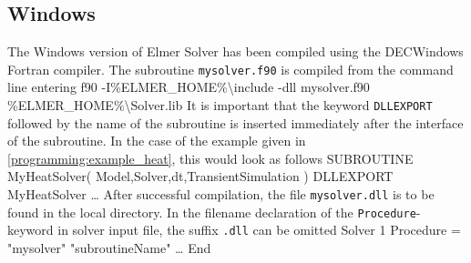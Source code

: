 \subsection{Windows\label{programming:compile_Win}}
The Windows version of Elmer Solver has been compiled using the DECWindows Fortran compiler. The subroutine \texttt{mysolver.f90} is compiled from the command line entering 
\ttbegin
f90 -I\%ELMER_HOME\%\textbackslash{include} -dll mysolver.f90 \%ELMER_HOME\%\textbackslash{Solver.lib}
\ttend
It is important that the keyword \texttt{DLLEXPORT} followed by the name of the subroutine is inserted immediately after the interface of the subroutine. In the case of the example given in \ref{programming:example_heat}, this would look as follows
\ttbegin
SUBROUTINE MyHeatSolver( Model,Solver,dt,TransientSimulation )
DLLEXPORT MyHeatSolver
\ldots
\ttend
After successful compilation, the file \texttt{mysolver.dll} is to be found in the local directory. In the filename declaration of the \texttt{Procedure}-keyword in solver input file, the suffix \texttt{.dll} can be omitted
\ttbegin
Solver 1
  Procedure = "mysolver" "subroutineName"
  \ldots
End
\ttend





